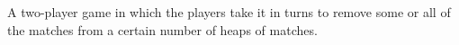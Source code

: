 A two-player game in which the players take it in turns
to remove some or all of the matches from a certain
number of heaps of matches.